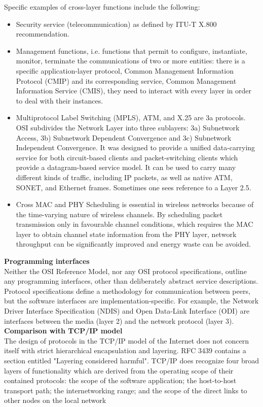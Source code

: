 \documentclass{article}
\begin{document}
Specific examples of cross-layer functions include the following:
\begin{itemize}
\item Security service (telecommunication) as defined by ITU-T X.800 recommendation.
\item Management functions, i.e. functions that permit to configure, instantiate, monitor, terminate the communications of two or more entities: there is a specific application-layer protocol, Common Management Information Protocol (CMIP) and its corresponding service, Common Management Information Service (CMIS), they need to interact with every layer in order to deal with their instances.
\item Multiprotocol Label Switching (MPLS), ATM, and X.25 are 3a protocols. OSI subdivides the Network Layer into three sublayers: 3a) Subnetwork Access, 3b) Subnetwork Dependent Convergence and 3c) Subnetwork Independent Convergence. It was designed to provide a unified data-carrying service for both circuit-based clients and packet-switching clients which provide a datagram-based service model. It can be used to carry many different kinds of traffic, including IP packets, as well as native ATM, SONET, and Ethernet frames. Sometimes one sees reference to a Layer 2.5.
\item Cross MAC and PHY Scheduling is essential in wireless networks because of the time-varying nature of wireless channels. By scheduling packet transmission only in favourable channel conditions, which requires the MAC layer to obtain channel state information from the PHY layer, network throughput can be significantly improved and energy waste can be avoided.
\end{itemize}

\textbf{Programming interfaces}\\

	Neither the OSI Reference Model, nor any OSI protocol specifications, outline any programming interfaces, other than deliberately abstract service descriptions. Protocol specifications define a methodology for communication between peers, but the software interfaces are implementation-specific. For example, the Network Driver Interface Specification (NDIS) and Open Data-Link Interface (ODI) are interfaces between the media (layer 2) and the network protocol (layer 3). \\
	
\textbf{Comparison with TCP/IP model}\\

	The design of protocols in the TCP/IP model of the Internet does not concern itself with strict hierarchical encapsulation and layering. RFC 3439 contains a section entitled "Layering considered harmful". TCP/IP does recognize four broad layers of functionality which are derived from the operating scope of their contained protocols: the scope of the software application; the host-to-host transport path; the internetworking range; and the scope of the direct links to other nodes on the local network
\end{document}
